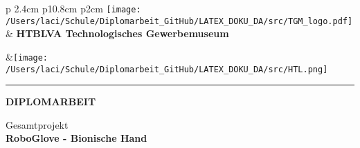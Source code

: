 \documentclass[titlepage,12pt,twoside]{article}
\begin{document}

\begin{titlepage}

	\begin{center}
	\begin{tabular}{p {2.4cm} p{10.8cm} p{2cm}}
	\texttt{[image: /Users/laci/Schule/Diplomarbeit\_GitHub/LATEX\_DOKU\_DA/src/TGM\_logo.pdf]}& \large{{\textbf{HTBLVA Technologisches Gewerbemuseum}}}\par\par{}&\texttt{[image: /Users/laci/Schule/Diplomarbeit\_GitHub/LATEX\_DOKU\_DA/src/HTL.png]}\\
	\end{tabular}
	\noindent\rule{1.1\textwidth}{1pt} 
	\end{center}
	
	\begin{center}
	
	\vspace*{1cm}
	\LARGE
	\textbf{DIPLOMARBEIT}
	
	\vspace{1.7cm}
	\normalsize
	Gesamtprojekt\\
	\LARGE
	\textbf{RoboGlove - Bionische Hand}\\
	\end{center}
	
	\vspace{1.7cm}
	
	\normalsize 
	\large
	

\end{titlepage}
\end{document}
